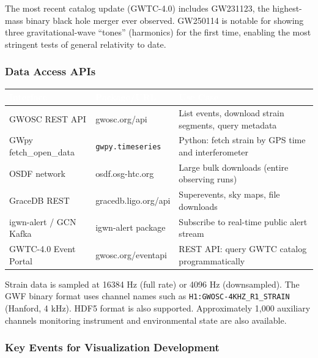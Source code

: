 \documentclass[11pt,letterpaper]{article}
\newcommand{\tableheader}[1]{\textbf{\sffamily\textcolor{white}{#1}}}
\begin{document}
The most recent catalog update (GWTC-4.0) includes GW231123, the highest-mass binary black hole merger ever observed. GW250114 is notable for showing three gravitational-wave ``tones'' (harmonics) for the first time, enabling the most stringent tests of general relativity to date.

\subsubsection{Data Access APIs}

\begin{center}
\begin{tabularx}{\textwidth}{L{3.5cm}L{3cm}X}
\toprule
{}
\tableheader{Interface} & \tableheader{Package/URL} & \tableheader{Use Case} \\
\midrule
GWOSC REST API & gwosc.org/api & List events, download strain segments, query metadata \\
GWpy fetch\_open\_data & \texttt{gwpy.timeseries} & Python: fetch strain by GPS time and interferometer \\
OSDF network & osdf.osg-htc.org & Large bulk downloads (entire observing runs) \\
GraceDB REST & gracedb.ligo.org/api & Superevents, sky maps, file downloads \\
igwn-alert / GCN Kafka & igwn-alert package & Subscribe to real-time public alert stream \\
GWTC-4.0 Event Portal & gwosc.org/eventapi & REST API: query GWTC catalog programmatically \\
\bottomrule
\end{tabularx}
\end{center}

Strain data is sampled at 16384 Hz (full rate) or 4096 Hz (downsampled). The GWF binary format uses channel names such as \texttt{H1:GWOSC-4KHZ\_R1\_STRAIN} (Hanford, 4 kHz). HDF5 format is also supported. Approximately 1,000 auxiliary channels monitoring instrument and environmental state are also available.

\subsubsection{Key Events for Visualization Development}
\end{document}
